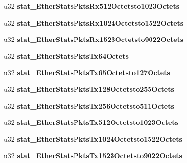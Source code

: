 \begin{DoxyCompactItemize}
\item 
\hypertarget{structstatistics__block_a8b56ecd47b535334a46a51d0338c8316}{
u32 {\bfseries stat\_\-EtherStatsPktsRx512Octetsto1023Octets}}
\label{structstatistics__block_a8b56ecd47b535334a46a51d0338c8316}

\item 
\hypertarget{structstatistics__block_a87403d65a586b3e3510ed64758d51727}{
u32 {\bfseries stat\_\-EtherStatsPktsRx1024Octetsto1522Octets}}
\label{structstatistics__block_a87403d65a586b3e3510ed64758d51727}

\item 
\hypertarget{structstatistics__block_acd55a76b00e6df80efa9fc78fcd40303}{
u32 {\bfseries stat\_\-EtherStatsPktsRx1523Octetsto9022Octets}}
\label{structstatistics__block_acd55a76b00e6df80efa9fc78fcd40303}

\item 
\hypertarget{structstatistics__block_ac12f976f6ea528e83dcbaa3bb4a92887}{
u32 {\bfseries stat\_\-EtherStatsPktsTx64Octets}}
\label{structstatistics__block_ac12f976f6ea528e83dcbaa3bb4a92887}

\item 
\hypertarget{structstatistics__block_abf78610ac67e301fb3108bca2e7c91b6}{
u32 {\bfseries stat\_\-EtherStatsPktsTx65Octetsto127Octets}}
\label{structstatistics__block_abf78610ac67e301fb3108bca2e7c91b6}

\item 
\hypertarget{structstatistics__block_aca382e7e503e436a82e20a3d193c9764}{
u32 {\bfseries stat\_\-EtherStatsPktsTx128Octetsto255Octets}}
\label{structstatistics__block_aca382e7e503e436a82e20a3d193c9764}

\item 
\hypertarget{structstatistics__block_a24b66ee262feb4ab6227b3593e6236a5}{
u32 {\bfseries stat\_\-EtherStatsPktsTx256Octetsto511Octets}}
\label{structstatistics__block_a24b66ee262feb4ab6227b3593e6236a5}

\item 
\hypertarget{structstatistics__block_ac06c8b64e256347ed58cb6c83d08a2ca}{
u32 {\bfseries stat\_\-EtherStatsPktsTx512Octetsto1023Octets}}
\label{structstatistics__block_ac06c8b64e256347ed58cb6c83d08a2ca}

\item 
\hypertarget{structstatistics__block_afb7232f378e21b68e68816376d0677ae}{
u32 {\bfseries stat\_\-EtherStatsPktsTx1024Octetsto1522Octets}}
\label{structstatistics__block_afb7232f378e21b68e68816376d0677ae}

\item 
\hypertarget{structstatistics__block_a42256fcce9dc9d5a21cf4bd04dfac5e1}{
u32 {\bfseries stat\_\-EtherStatsPktsTx1523Octetsto9022Octets}}
\label{structstatistics__block_a42256fcce9dc9d5a21cf4bd04dfac5e1}


\end{DoxyCompactItemize}
